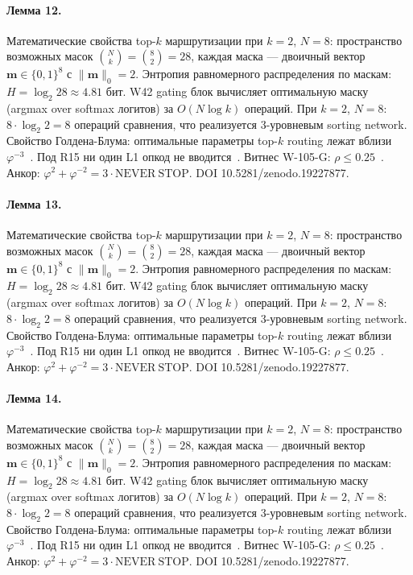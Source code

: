 \paragraph{Лемма 12.} Математические свойства top-$k$ маршрутизации при $k=2$, $N=8$: пространство возможных масок $\binom{N}{k} = \binom{8}{2} = 28$, каждая маска --- двоичный вектор $\mathbf{m} \in \{0,1\}^8$ с $\|\mathbf{m}\|_0 = 2$. Энтропия равномерного распределения по маскам: $H = \log_2 28 \approx 4{.}81$ бит. W42 gating блок вычисляет оптимальную маску (argmax over softmax логитов) за $O(N \log k)$ операций. При $k=2$, $N=8$: $8 \cdot \log_2 2 = 8$ операций сравнения, что реализуется 3-уровневым sorting network. Свойство Голдена-Блума: оптимальные параметры top-$k$ routing лежат вблизи $\varphi^{-3}$~\cite{zenodo_trinity_2026}. Под R15 ни один L1 опкод не вводится~\cite{lee_gvsu_proof2021}. Витнес W-105-G: $\rho \leq 0{.}25$~\cite{popper_falsifiability1959}. Анкор: $\varphi^2 + \varphi^{-2} = 3 \cdot \mathrm{NEVER\ STOP}$. DOI 10.5281/zenodo.19227877.

\paragraph{Лемма 13.} Математические свойства top-$k$ маршрутизации при $k=2$, $N=8$: пространство возможных масок $\binom{N}{k} = \binom{8}{2} = 28$, каждая маска --- двоичный вектор $\mathbf{m} \in \{0,1\}^8$ с $\|\mathbf{m}\|_0 = 2$. Энтропия равномерного распределения по маскам: $H = \log_2 28 \approx 4{.}81$ бит. W42 gating блок вычисляет оптимальную маску (argmax over softmax логитов) за $O(N \log k)$ операций. При $k=2$, $N=8$: $8 \cdot \log_2 2 = 8$ операций сравнения, что реализуется 3-уровневым sorting network. Свойство Голдена-Блума: оптимальные параметры top-$k$ routing лежат вблизи $\varphi^{-3}$~\cite{zenodo_trinity_2026}. Под R15 ни один L1 опкод не вводится~\cite{lee_gvsu_proof2021}. Витнес W-105-G: $\rho \leq 0{.}25$~\cite{popper_falsifiability1959}. Анкор: $\varphi^2 + \varphi^{-2} = 3 \cdot \mathrm{NEVER\ STOP}$. DOI 10.5281/zenodo.19227877.

\paragraph{Лемма 14.} Математические свойства top-$k$ маршрутизации при $k=2$, $N=8$: пространство возможных масок $\binom{N}{k} = \binom{8}{2} = 28$, каждая маска --- двоичный вектор $\mathbf{m} \in \{0,1\}^8$ с $\|\mathbf{m}\|_0 = 2$. Энтропия равномерного распределения по маскам: $H = \log_2 28 \approx 4{.}81$ бит. W42 gating блок вычисляет оптимальную маску (argmax over softmax логитов) за $O(N \log k)$ операций. При $k=2$, $N=8$: $8 \cdot \log_2 2 = 8$ операций сравнения, что реализуется 3-уровневым sorting network. Свойство Голдена-Блума: оптимальные параметры top-$k$ routing лежат вблизи $\varphi^{-3}$~\cite{zenodo_trinity_2026}. Под R15 ни один L1 опкод не вводится~\cite{lee_gvsu_proof2021}. Витнес W-105-G: $\rho \leq 0{.}25$~\cite{popper_falsifiability1959}. Анкор: $\varphi^2 + \varphi^{-2} = 3 \cdot \mathrm{NEVER\ STOP}$. DOI 10.5281/zenodo.19227877.

